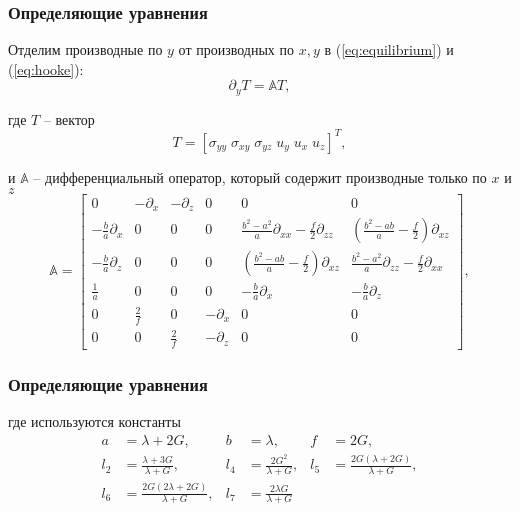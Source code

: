 \documentclass[10pt]{beamer}
\begin{document}
\begin{frame}
\frametitle{Определяющие уравнения}
Отделим производные по $y$ от производных по $x, y$ в (\ref{eq:equilibrium}) и (\ref{eq:hooke}):
\begin{equation}
	\label{eq:separate}
	\partial_{y} T = \mathbb{A}T,
\end{equation}

где $T$ -- вектор
\begin{equation}
	\label{eq:T}
	T = \left[\sigma_{yy} \; \sigma_{xy} \; \sigma_{yz} \; u_{y} \; u_{x} \; u_{z}\right]^T,
\end{equation}

и $\mathbb{A}$ -- дифференциальный оператор, который содержит производные только по $x$ и $z$
\begin{equation}
	\label{eq:A}
	\mathbb{A} = 
	\left[\begin{array}{cccccc}
		0 & -\partial_x & -\partial_z & 0 & 0 & 0 \\
		-\frac{b}{a}\partial_x & 0 & 0 & 0 & \frac{b^2-a^2}{a}\partial_{xx} - \frac{f}{2}\partial_{zz} & \left( \frac{b^2-ab}{a} - \frac{f}{2} \right) \partial_{xz} \\
		-\frac{b}{a}\partial_z & 0 & 0 & 0 & \left( \frac{b^2-ab}{a} - \frac{f}{2} \right) \partial_{xz} & \frac{b^2-a^2}{a}\partial_{zz} - \frac{f}{2}\partial_{xx} \\
		\frac{1}{a} & 0 & 0 & 0 & -\frac{b}{a}\partial_x & -\frac{b}{a}\partial_z \\
		0 & \frac{2}{f} & 0 & -\partial_x & 0 & 0 \\
		0 & 0 & \frac{2}{f} & -\partial_z & 0 & 0 
	\end{array}\right],
\end{equation}
\end{frame}



\begin{frame}
\frametitle{Определяющие уравнения}
где используются константы
\begin{align*}
	a & = \lambda + 2G, &     b & = \lambda, &     f & = 2G, \\
	l_2 & = \frac{\lambda + 3G}{\lambda + G}, &     l_4 & = \frac{2G^2}{\lambda+G}, &   l_5 & = \frac{2G(\lambda + 2G)}{\lambda + G}, \\
	l_6 & = \frac{2G(2\lambda + 2G)}{\lambda + G}, &   l_7 & = \frac{2\lambda G}{\lambda+G}
\end{align*}
\end{frame}
\end{document}
